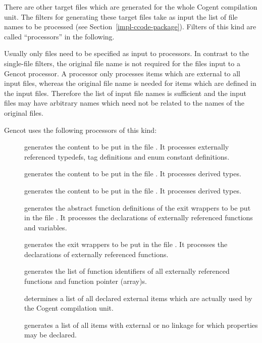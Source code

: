 There are other target files which are generated for the whole Cogent compilation unit. The filters for generating these target files 
take as input the list of file names to be processed (see Section~\ref{impl-ccode-package}). Filters of this kind 
are called ``processors'' in the following.

Usually only  files need to be specified as input to processors.
In contrast to the single-file filters, the original file name is not required for the files input to a 
Gencot processor. A processor only processes items which are external to all input files, whereas the original
file name is needed for items which are defined in the input files. Therefore the list of input file names is
sufficient and the input files may have arbitrary names which need not be related to the names of the original 
 files.

Gencot uses the following processors of this kind:
\begin{description}
\item[] generates the content to be put in the file . It 
processes externally referenced typedefs, tag definitions and enum constant definitions.
\item[] generates the content to be put in the file . It 
processes derived types.
\item[] generates the content to be put in the file . It 
processes derived types.
\item[] generates the abstract function definitions of the exit wrappers to be put in the file 
. It processes the declarations of externally referenced functions and variables.
\item[] generates the exit wrappers to be put in the file . It processes
the declarations of externally referenced functions.
\item[] generates the list of function identifiers of all externally referenced functions and
function pointer (array)s.
\item[] determines a list of all declared external items which are actually used by the Cogent
compilation unit.
\item[] generates a list of all items with external or no linkage 
for which properties may be declared.
\end{description}

